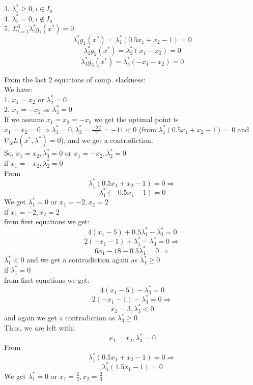 \documentclass[12pt]{article}
\begin{document}
3. $\lambda_i^* \geq 0, i \in I_a$\\

4. $\lambda_i^* = 0, i \notin I_a$\\

5. $\Sigma_{i=1}^3\lambda_i^*g_i(x^*) = 0$\\
$$ \lambda_1^*g_1(x^*) = \lambda_1^*(0.5x_1 +x_2 -1) = 0$$
$$ \lambda_2^*g_2(x^*) = \lambda_2^*(x_1 -x_2) = 0$$
$$ \lambda_3^*g_3(x^*) = \lambda_3^*(-x_1 -x_2) = 0$$

From the last 2 equations of comp. slackness:\\
We have:\\
1. $x_1=x_2$ or $\lambda_2^*=0$\\
2. $x_1=-x_2$ or $\lambda_3^*=0$\\

If we assume $x_1=x_2 = -x_2$ we get the optimal point is $x_1=x_2=0 \Rightarrow \lambda^*_1 = 0, \lambda^*_3 = \frac{-22}{2}=-11<0$ (from $\lambda_1^*(0.5x_1 +x_2 -1) = 0$ and $\nabla_x L(x^*,\lambda^*) = 0$), and we get a contradiction.\\

So, $x_1=x_2,\lambda^*_3=0$ or $x_1=-x_2,\lambda^*_2=0$\\

if $x_1=-x_2,\lambda^*_2=0$\\
From $$\lambda_1^*(0.5x_1 +x_2 -1) = 0\Rightarrow$$
$$\lambda_1^*(-0.5x_1 -1) = 0$$
We get $\lambda_1^*=0$ or $x_1=-2, x_2=2$\\

if $x_1=-2, x_2=2$\\
from first equations we get:\\
$$4(x_1-5) + 0.5\lambda^*_1 -\lambda^*_3 = 0$$
$$2(-x_1-1) + \lambda^*_1 -\lambda^*_3 = 0 \Rightarrow$$
$$6x_1-18 - 0.5\lambda^*_1 = 0\Rightarrow$$
$\lambda^*_1<0$ and we get a contradiction again as $\lambda^*_1\geq 0$\\

if $\lambda^*_1=0$\\
from first equations we get:\\
$$4(x_1-5) -\lambda^*_3 = 0$$
$$2(-x_1-1) -\lambda^*_3 = 0 \Rightarrow$$
$$x_1=3, \lambda^*_3 <0$$ and again we get a contradiction as $\lambda^*_3\geq 0$\\

Thus, we are left with:\\
$$x_1=x_2,\lambda^*_3=0$$
From $$\lambda^*_1(0.5x_1 +x_2 -1) = 0\Rightarrow$$
$$\lambda^*_1(1.5x_1 -1) = 0$$
We get $\lambda^*_1=0$ or $x_1=\frac{2}{3}, x_2=\frac{2}{3}$\\
\end{document}
